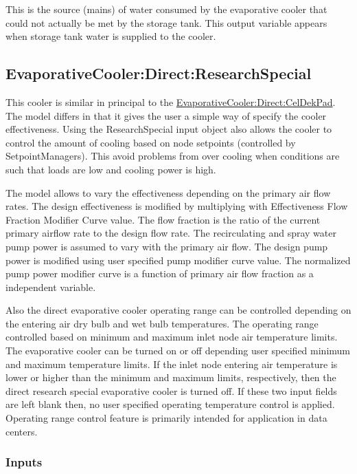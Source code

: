 This is the source (mains) of water consumed by the evaporative cooler that could not actually be met by the storage tank. This output variable appears when storage tank water is supplied to the cooler.

\subsection{EvaporativeCooler:Direct:ResearchSpecial}\label{evaporativecoolerdirectresearchspecial}

This cooler is similar in principal to the \hyperref[evaporativecoolerdirectceldekpad]{EvaporativeCooler:Direct:CelDekPad}. The model differs in that it gives the user a simple way of specify the cooler effectiveness. Using the ResearchSpecial input object also allows the cooler to control the amount of cooling based on node setpoints (controlled by SetpointManagers). This avoid problems from over cooling when conditions are such that loads are low and cooling power is high.

The model allows to vary the effectiveness depending on the primary air flow rates. The design effectiveness is modified by multiplying with Effectiveness Flow Fraction Modifier Curve value. The flow fraction is the ratio of the current primary airflow rate to the design flow rate. The recirculating and spray water pump power is assumed to vary with the primary air flow. The design pump power is modified using user specified pump modifier curve value. The normalized pump power modifier curve is a function of primary air flow fraction as a independent variable.

Also the direct evaporative cooler operating range can be controlled depending on the entering air dry bulb and wet bulb temperatures. The operating range controlled based on minimum and maximum inlet node air temperature limits. The evaporative cooler can be turned on or off depending user specified minimum and maximum temperature limits. If the inlet node entering air temperature is lower or higher than the minimum and maximum limits, respectively, then the direct research special evaporative cooler is turned off. If these two input fields are left blank then, no user specified operating temperature control is applied. Operating range control feature is primarily intended for application in data centers.

\subsubsection{Inputs}\label{inputs-1-014}

